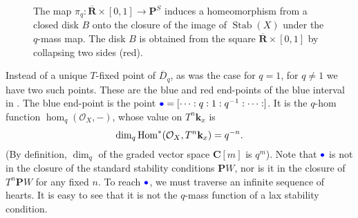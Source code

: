 \documentclass{amsart}
\begin{document}
\begin{figure}[ht]
  \centering
  \caption{The map \(\pi_{q} \colon \overline{\mathbf{R}} \times [0,1] \to \mathbf{P}^S\) induces a homeomorphism from a closed disk \(B\) onto the closure of the image of \(\operatorname{Stab}(X)\) under the \(q\)-mass map.
    The disk \(B\) is obtained from the square \(\overline{\mathbf{R}} \times [0,1]\) by collapsing two sides (red).
  }
  \label{fig:q-accordion}
\end{figure}

Instead of a unique \(T\)-fixed point of \(\overline D_q\), as was the case for \(q = 1\), for \(q \neq 1\) we have two such points.
These are the blue and red end-points of the blue interval in .
The blue end-point is the point \(\textcolor{blue}{\bullet} = [\cdots : q : 1 : q^{-1} : \cdots : ]\).
It is the \(q\)-hom function \(\hom_q(\mathcal{O}_X, -)\), whose value on \(T^n\mathbf{k}_x\) is
\[ \dim_q \operatorname{Hom}^{*}(\mathcal{O}_X, T^n \mathbf{k}_x) = q^{-n}.\]
(By definition, \(\dim_q\) of the graded vector space \(\mathbf{C}[m]\) is \(q^m\)).
Note that \(\textcolor{blue}{\bullet}\) is not in the closure of the standard stability conditions \(\mathbf{P}W\), nor is it in the closure of \(T^n \mathbf{P}W\) for any fixed \(n\).
To reach \(\textcolor{blue}{\bullet}\), we must traverse an infinite sequence of hearts.
It is easy to see that it is not the \(q\)-mass function of a lax stability condition.
\end{document}
